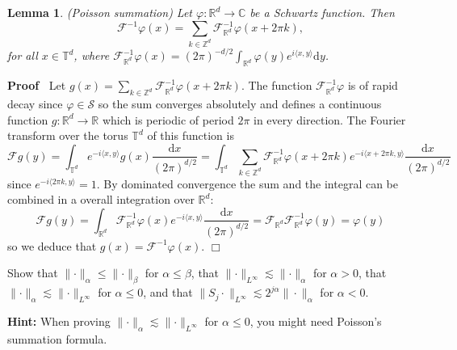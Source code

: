 \documentclass[a4paper,11pt]{article}
\newcommand{\cdummy}{\cdot}
\newcommand{\mathd}{\mathrm{d}}
\newcommand{\tmtextbf}[1]{{\bfseries{#1}}}
\newenvironment{proof}{\noindent\textbf{Proof\ }}{\hspace*{\fill}$\Box$\medskip}
\newtheorem{lemma}{Lemma}
{\theorembodyfont{\rmfamily}\newtheorem{remark}{Remark}}
\newcommand{\CF}{\mathscr{F}}
\newcommand{\CS}{\mathscr{S}}
\begin{document}
\begin{lemma}
  \label{lem:poisson}(Poisson summation) Let $\varphi : \mathbb{R}^d
  \rightarrow \mathbb{C}$ be a Schwartz function. Then
  \[ \CF^{- 1} \varphi (x) = \sum_{k \in \mathbb{Z}^d} \CF^{-
     1}_{\mathbb{R}^d} \varphi (x + 2 \pi k), \]
  for all $x \in \mathbb{T}^d$, where $\CF^{- 1}_{\mathbb{R}^d} \varphi (x)
  = (2 \pi)^{- d / 2} \int_{\mathbb{R}^d} \varphi (y) e^{i \langle x, y
  \rangle} \mathd y$.
\end{lemma}

\begin{proof}
  Let $g (x) = \sum_{k \in \mathbb{Z}^d} \CF^{- 1}_{\mathbb{R}^d} \varphi (x
  + 2 \pi k)$. The function $\CF^{- 1}_{\mathbb{R}^d} \varphi$ is of rapid
  decay since $\varphi \in \CS$ so the sum converges absolutely and defines a
  continuous function $g : \mathbb{R}^d \rightarrow \mathbb{R}$ which is
  periodic of period $2 \pi$ in every direction. The Fourier transform over
  the torus $\mathbb{T}^d$ of this function is
  \[ \CF g (y) = \int_{\mathbb{T}^d} e^{- i \langle x, y \rangle} g (x)
     \frac{\mathd x}{(2 \pi)^{d / 2}} = \int_{\mathbb{T}^d} \sum_{k \in
     \mathbb{Z}^d} \CF^{- 1}_{\mathbb{R}^d} \varphi (x + 2 \pi k) e^{- i
     \langle x + 2 \pi k, y \rangle} \frac{\mathd x}{(2 \pi)^{d / 2}} \]
  since $e^{- i \langle 2 \pi k, y \rangle} = 1$. By dominated convergence the
  sum and the integral can be combined in a overall integration over
  $\mathbb{R}^d$:
  \[ \CF g (y) = \int_{\mathbb{R}^d} \CF^{- 1}_{\mathbb{R}^d} \varphi (x)
     e^{- i \langle x, y \rangle} \frac{\mathd x}{(2 \pi)^{d / 2}} =
     \CF_{\mathbb{R}^d} \CF^{- 1}_{\mathbb{R}^d} \varphi (y) = \varphi (y)
  \]
  so we deduce that $g (x) = \CF^{- 1} \varphi (x)$.
\end{proof}

\begin{exercise}
  \label{exercise:besov-space-inequalities}Show that $\lVert \cdummy
  \rVert_{\alpha} \leqslant \lVert \cdummy \rVert_{\beta}$ for $\alpha
  \leqslant \beta$, that $\lVert \cdummy \rVert_{L^{\infty}} \lesssim \lVert
  \cdummy \rVert_{\alpha}$ for $\alpha > 0$, that $\lVert \cdummy
  \rVert_{\alpha} \lesssim \lVert \cdummy \rVert_{L^{\infty}}$ for $\alpha
  \leqslant 0$, and that $\|S_j \cdummy \|_{L^{\infty}} \lesssim 2^{j \alpha}
  \| \cdummy \|_{\alpha}$ for $\alpha < 0$.
  
  \tmtextbf{Hint:} When proving $\lVert \cdummy \rVert_{\alpha} \lesssim
  \lVert \cdummy \rVert_{L^{\infty}}$ for $\alpha \leqslant 0$, you might need
  Poisson's summation formula.
\end{exercise}
\end{document}

